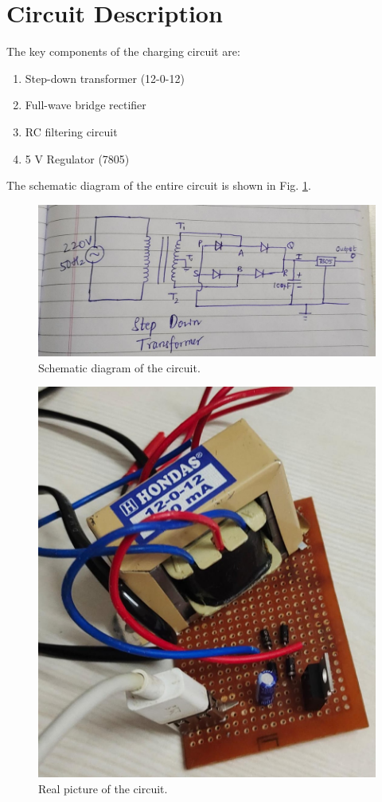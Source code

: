 \documentclass[journal,12pt,twocolumn]{IEEEtran}
\begin{document}
\section{Circuit Description}
The key components of the charging circuit are:
\begin{enumerate}
    \item Step-down transformer (12-0-12)
    \item Full-wave bridge rectifier
    \item RC filtering circuit
    \item 5 V Regulator (7805)
\end{enumerate}
The schematic diagram of the entire circuit is shown in Fig. \ref{fig:ckt}.
\begin{figure}[!htb]
    \includegraphics[width=\columnwidth]{figs/circuit_1.jpeg}
    \caption{Schematic diagram of the circuit.}
    \label{fig:ckt} 
\end{figure}
\begin{figure}[!htb]
    \includegraphics[width=\columnwidth]{figs/ckt_charger.jpeg}
    \caption{Real picture of the circuit.}
    \label{fig:hardware}
\end{figure}
\end{document}
